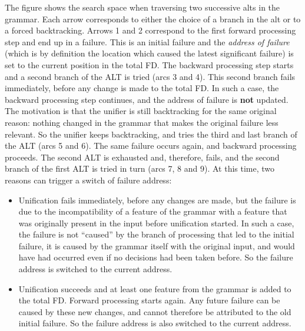 \documentclass[10pt,a4paper]{report}
\begin{document}
The figure shows the search space when traversing two successive alts in
the grammar.  Each arrow corresponds to either the choice of a branch in
the alt or to a forced backtracking.  Arrows 1 and 2 correspond to the
first forward processing step and end up in a failure.  This is an initial
failure and the {\em address of failure} (which is by definition the location
which caused the latest significant failure) is set to the current position
in the total FD.  The backward processing step starts and a second branch
of the ALT is tried (arcs 3 and 4).  This second branch fails immediately,
before any change is made to the total FD.  In such a case, the backward
processing step continues, and the address of failure is {\bf not} updated.
The motivation is that the unifier is still backtracking for the same
original reason: nothing changed in the grammar that makes the original
failure less relevant.  So the unifier keeps backtracking, and tries the
third and last branch of the ALT (arcs 5 and 6).  The same failure occurs
again, and backward processing proceeds.  The second ALT is exhausted and,
therefore, fails, and the second branch of the first ALT is tried in turn
(arcs 7, 8 and 9).  At this time, two reasons can trigger a switch of
failure address:
\begin{itemize}
\item Unification fails immediately, before any changes are made, but the failure
is due to the incompatibility of a feature of the grammar with a feature
that was originally present in the input before unification started.  In
such a case, the failure is not ``caused'' by the branch of processing that
led to the initial failure, it is caused by the grammar itself with the
original input, and would have had occurred even if no decisions had been
taken before.  So the failure address is switched to the current address.

\item Unification succeeds and at least one feature from the grammar is added to
the total FD.  Forward processing starts again.  Any future failure can be
caused by these new changes, and cannot therefore be attributed to the old
initial failure.  So the failure address is also switched to the current
address.
\end{itemize}
\end{document}
